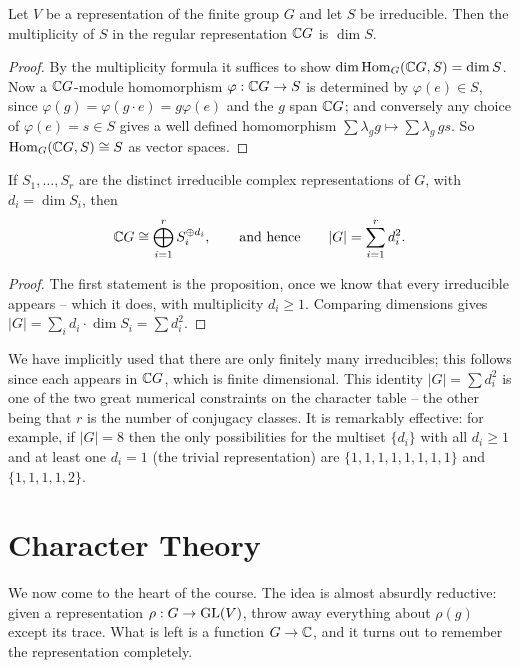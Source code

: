 \documentclass[a4paper]{scrartcl}
\newcommand{\Hom}{\operatorname{Hom}}
\begin{document}
\begin{proposition}
	Let $V$ be a representation of the finite group $G$ and let $S$ be irreducible. Then the multiplicity of $S$ in the regular representation $\mathbb{C} G$ is $\dim S$.
\end{proposition}
\begin{proof}
	By the multiplicity formula it suffices to show $\dim \Hom_G(\C G, S) = \dim S$. Now a $\mathbb{C} G$-module homomorphism $\varphi : \mathbb{C} G \to S$ is determined by $\varphi(e) \in S$, since $\varphi(g) = \varphi(g \cdot e) = g\varphi(e)$ and the $g$ span $\mathbb{C} G$; and conversely any choice of $\varphi(e) = s \in S$ gives a well defined homomorphism $\sum \lambda_g g \mapsto \sum \lambda_g \, g s$. So $\Hom_G(\C G, S) \cong S$ as vector spaces.
\end{proof}

\begin{corollary}
	If $S_1, \dots, S_r$ are the distinct irreducible complex representations of $G$, with $d_i = \dim S_i$, then
	$$\mathbb{C} G \cong \bigoplus_{i=1}^r S_i^{\oplus d_i}, \qquad \text{and hence} \qquad |G| = \sum_{i=1}^r d_i^2.$$
\end{corollary}
\begin{proof}
	The first statement is the proposition, once we know that every irreducible appears -- which it does, with multiplicity $d_i \geq 1$. Comparing dimensions gives $|G| = \sum_i d_i \cdot \dim S_i = \sum d_i^2$.
\end{proof}

We have implicitly used that there are only finitely many irreducibles; this follows since each appears in $\mathbb{C} G$, which is finite dimensional. This identity $|G| = \sum d_i^2$ is one of the two great numerical constraints on the character table -- the other being that $r$ is the number of conjugacy classes. It is remarkably effective: for example, if $|G| = 8$ then the only possibilities for the multiset $\{d_i\}$ with all $d_i \geq 1$ and at least one $d_i = 1$ (the trivial representation) are $\{1,1,1,1,1,1,1,1\}$ and $\{1,1,1,1,2\}$.

\section{Character Theory}

We now come to the heart of the course. The idea is almost absurdly reductive: given a representation $\rho : G \to \operatorname{GL}(V)$, throw away everything about $\rho(g)$ except its trace. What is left is a function $G \to \mathbb{C}$, and it turns out to remember the representation completely.
\end{document}

